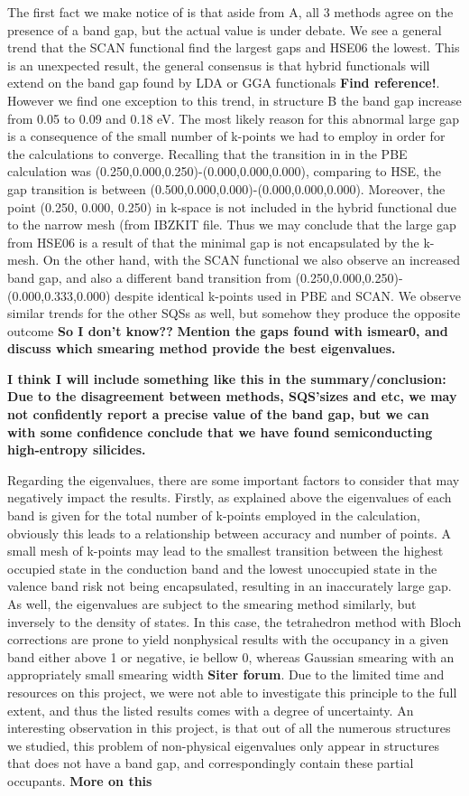 The first fact we make notice of is that aside from A, all 3 methods agree on the presence of a band gap, but the actual value is under debate. We see a general trend that the SCAN functional find the largest gaps and HSE06 the lowest. This is an unexpected result, the general consensus is that hybrid functionals will extend on the band gap found by LDA or GGA functionals \textbf{Find reference!}. However we find one exception to this trend, in structure B the band gap increase from 0.05 to 0.09 and 0.18 eV. The most likely reason for this abnormal large gap is a consequence of the small number of k-points we had to employ in order for the calculations to converge. Recalling that the transition in in the PBE calculation was (0.250,0.000,0.250)-(0.000,0.000,0.000), comparing to HSE, the gap transition is between (0.500,0.000,0.000)-(0.000,0.000,0.000). Moreover, the point (0.250, 0.000, 0.250) in k-space is not included in the hybrid functional due to the narrow mesh (from IBZKIT file. Thus we may conclude that the large gap from HSE06 is a result of that the minimal gap is not encapsulated by the k-mesh. On the other hand, with the SCAN functional we also observe an increased band gap, and also a different band transition from (0.250,0.000,0.250)-(0.000,0.333,0.000) despite identical k-points used in PBE and SCAN. We observe similar trends for the other SQSs as well, but somehow they produce the opposite outcome \textbf{So I don't know??} \textbf{Mention the gaps found with ismear0, and discuss which smearing method provide the best eigenvalues.}

\textbf{I think I will include something like this in the summary/conclusion: Due to the disagreement between methods, SQS'sizes and etc, we may not confidently report a precise value of the band gap, but we can with some confidence conclude that we have found semiconducting high-entropy silicides.}   

Regarding the eigenvalues, there are some important factors to consider that may negatively impact the results. Firstly, as explained above the eigenvalues of each band is given for the total number of k-points employed in the calculation, obviously this leads to a relationship between accuracy and number of points. A small mesh of k-points may lead to the smallest transition between the highest occupied state in the conduction band and the lowest unoccupied state in the valence band risk not being encapsulated, resulting in an inaccurately large gap. As well, the eigenvalues are subject to the smearing method similarly, but inversely to the density of states. In this case, the tetrahedron method with Bloch corrections are prone to yield nonphysical results with the occupancy in a given band either above 1 or negative, ie bellow 0, whereas Gaussian smearing with an appropriately small smearing width \textbf{Siter forum}. Due to the limited time and resources on this project, we were not able to investigate this principle to the full extent, and thus the listed results comes with a degree of uncertainty. An interesting observation in this project, is that out of all the numerous structures we studied, this problem of non-physical eigenvalues only appear in structures that does not have a band gap, and correspondingly contain these partial occupants. \textbf{More on this}

